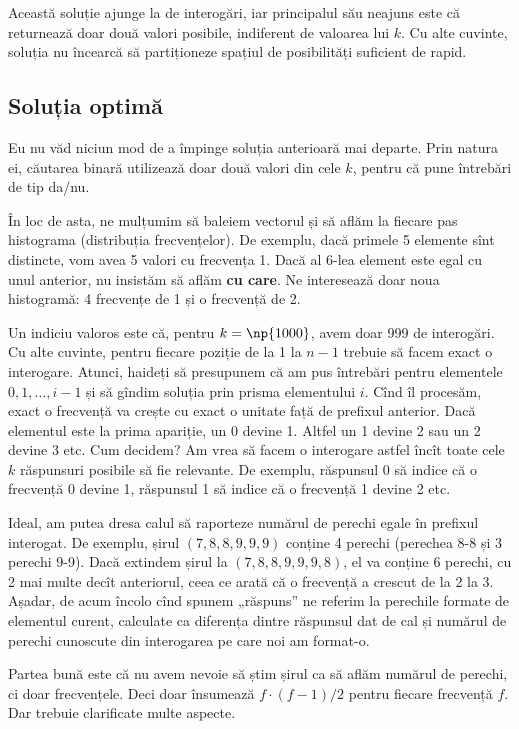 Această soluție ajunge la  de interogări, iar principalul său neajuns este că  returnează doar două valori posibile, indiferent de valoarea lui $k$. Cu alte cuvinte, soluția nu încearcă să partiționeze spațiul de posibilități suficient de rapid.

\subsection{Soluția optimă}

Eu nu văd niciun mod de a împinge soluția anterioară mai departe. Prin natura ei, căutarea binară utilizează doar două valori din cele $k$, pentru că pune întrebări de tip da/nu.

În loc de asta, ne mulțumim să baleiem vectorul și să aflăm la fiecare pas histograma (distribuția frecvențelor). De exemplu, dacă primele 5 elemente sînt distincte, vom avea 5 valori cu frecvența 1. Dacă al 6-lea element este egal cu unul anterior, nu insistăm să aflăm \textbf{cu care}. Ne interesează doar noua histogramă: 4 frecvențe de 1 și o frecvență de 2.

Un indiciu valoros este că, pentru $k = \np{1000}$, avem doar 999 de interogări. Cu alte cuvinte, pentru fiecare poziție de la 1 la $n-1$ trebuie să facem exact o interogare. Atunci, haideți să presupunem că am pus întrebări pentru elementele $0, 1, \dots, i-1$ și să gîndim soluția prin prisma elementului $i$. Cînd îl procesăm, exact o frecvență va crește cu exact o unitate față de prefixul anterior. Dacă elementul este la prima apariție, un 0 devine 1. Altfel un 1 devine 2 sau un 2 devine 3 etc. Cum decidem? Am vrea să facem o interogare astfel încît toate cele $k$ răspunsuri posibile să fie relevante. De exemplu, răspunsul 0 să indice că o frecvență 0 devine 1, răspunsul 1 să indice că o frecvență 1 devine 2 etc.

Ideal, am putea dresa calul să raporteze numărul de perechi egale în prefixul interogat. De exemplu, șirul $(7, 8, 8, 9, 9, 9)$ conține 4 perechi (perechea 8-8 și 3 perechi 9-9). Dacă extindem șirul la $(7, 8, 8, 9, 9, 9, 8)$, el va conține 6 perechi, cu 2 mai multe decît anteriorul, ceea ce arată că o frecvență a crescut de la 2 la 3. Așadar, de acum încolo cînd spunem „răspuns” ne referim la perechile formate de elementul curent, calculate ca diferența dintre răspunsul dat de cal și numărul de perechi cunoscute din interogarea pe care noi am format-o.

Partea bună este că nu avem nevoie să știm șirul ca să aflăm numărul de perechi, ci doar frecvențele. Deci  doar însumează $f \cdot (f-1)/2$ pentru fiecare frecvență $f$. Dar trebuie clarificate multe aspecte.

